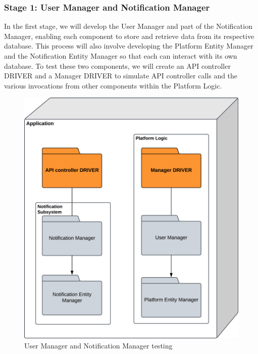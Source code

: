     \subsubsection{Stage 1: User Manager and Notification Manager}
    In the first stage, we will develop the User Manager and part of the Notification Manager, enabling each component to store and retrieve data from its respective database. This process will also involve developing the Platform Entity Manager and the Notification Entity Manager so that each can interact with its own database. To test these two components, we will create an API controller DRIVER and a Manager DRIVER to simulate API controller calls and the various invocations from other components within the Platform Logic.\\ 
    \begin{figure}[H]
    \includegraphics[width=0.35\linewidth]{Latex/Images/DD/Testing/TestingPlanStep1.png}
    \centering
    \caption{User Manager and Notification Manager testing}
    \label{fig:test-step1}
    \end{figure}
    
